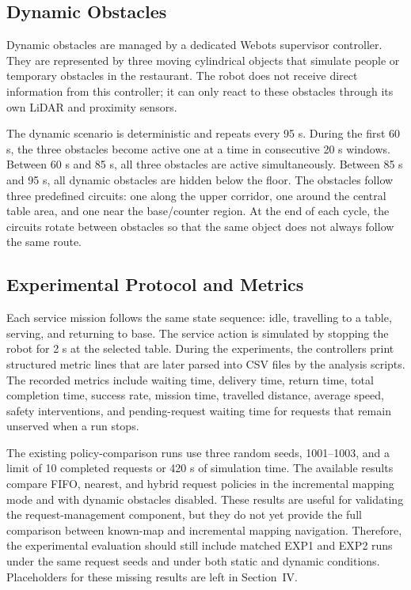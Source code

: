 \documentclass[conference]{IEEEtran}
\begin{document}
\subsection{Dynamic Obstacles}

Dynamic obstacles are managed by a dedicated Webots supervisor controller. They
are represented by three moving cylindrical objects that simulate people or
temporary obstacles in the restaurant. The robot does not receive direct
information from this controller; it can only react to these obstacles through
its own LiDAR and proximity sensors.

The dynamic scenario is deterministic and repeats every 95 s. During the first
60 s, the three obstacles become active one at a time in consecutive 20 s
windows. Between 60 s and 85 s, all three obstacles are active simultaneously.
Between 85 s and 95 s, all dynamic obstacles are hidden below the floor. The
obstacles follow three predefined circuits: one along the upper corridor, one
around the central table area, and one near the base/counter region. At the end
of each cycle, the circuits rotate between obstacles so that the same object
does not always follow the same route.

\subsection{Experimental Protocol and Metrics}

Each service mission follows the same state sequence: idle, travelling to a
table, serving, and returning to base. The service action is simulated by
stopping the robot for 2 s at the selected table. During the experiments, the
controllers print structured metric lines that are later parsed into CSV files
by the analysis scripts. The recorded metrics include waiting time, delivery
time, return time, total completion time, success rate, mission time, travelled
distance, average speed, safety interventions, and pending-request waiting time
for requests that remain unserved when a run stops.

The existing policy-comparison runs use three random seeds, 1001--1003, and a
limit of 10 completed requests or 420 s of simulation time. The available
results compare FIFO, nearest, and hybrid request policies in the incremental
mapping mode and with dynamic obstacles disabled. These results are useful for
validating the request-management component, but they do not yet provide the
full comparison between known-map and incremental mapping navigation. Therefore,
the experimental evaluation should still include matched EXP1 and EXP2 runs
under the same request seeds and under both static and dynamic conditions.
Placeholders for these missing results are left in Section~IV.
\end{document}
